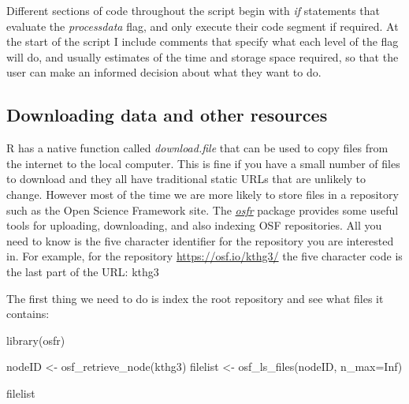\documentclass[
]{article}
\newenvironment{Shaded}{\begin{snugshade}}{\end{snugshade}}
\newcommand{\AttributeTok}[1]{\textcolor[rgb]{0.77,0.63,0.00}{#1}}
\newcommand{\ConstantTok}[1]{\textcolor[rgb]{0.00,0.00,0.00}{#1}}
\newcommand{\FunctionTok}[1]{\textcolor[rgb]{0.00,0.00,0.00}{#1}}
\newcommand{\NormalTok}[1]{#1}
\newcommand{\OtherTok}[1]{\textcolor[rgb]{0.56,0.35,0.01}{#1}}
\newcommand{\StringTok}[1]{\textcolor[rgb]{0.31,0.60,0.02}{#1}}
\begin{document}
Different sections of code throughout the script begin with \emph{if} statements that evaluate the \emph{processdata} flag, and only execute their code segment if required. At the start of the script I include comments that specify what each level of the flag will do, and usually estimates of the time and storage space required, so that the user can make an informed decision about what they want to do.

\hypertarget{downloading-data-and-other-resources}{%
\subsection{Downloading data and other resources}\label{downloading-data-and-other-resources}}

R has a native function called \emph{download.file} that can be used to copy files from the internet to the local computer. This is fine if you have a small number of files to download and they all have traditional static URLs that are unlikely to change. However most of the time we are more likely to store files in a repository such as the Open Science Framework site. The \href{https://cran.r-project.org/package=osfr}{\emph{osfr}} package provides some useful tools for uploading, downloading, and also indexing OSF repositories. All you need to know is the five character identifier for the repository you are interested in. For example, for the repository \url{https://osf.io/kthg3/} the five character code is the last part of the URL: kthg3

The first thing we need to do is index the root repository and see what files it contains:

\begin{Shaded}
\begin{Highlighting}[]
\FunctionTok{library}\NormalTok{(osfr)}

\NormalTok{nodeID }\OtherTok{\textless{}{-}} \FunctionTok{osf\_retrieve\_node}\NormalTok{(}\StringTok{\textquotesingle{}kthg3\textquotesingle{}}\NormalTok{)}
\NormalTok{filelist }\OtherTok{\textless{}{-}} \FunctionTok{osf\_ls\_files}\NormalTok{(nodeID, }\AttributeTok{n\_max=}\ConstantTok{Inf}\NormalTok{)}

\NormalTok{filelist}
\end{Highlighting}
\end{Shaded}
\end{document}
